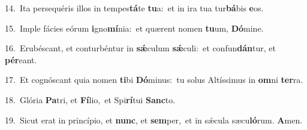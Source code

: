 {\numbfont\textcolor{\numbcolor}{14.}}~Ita persequéris illos in tempes\-\textbf{tá}\-te \textbf{tu}\-a:~\star et in ira tua tur\-\textbf{bá}\-bis \textbf{e}\-os.\par
{\numbfont\textcolor{\numbcolor}{15.}}~Imple fácies eórum \textbf{i}\-gno\-\textbf{mí}\-nia:~\star et quærent nomen \textbf{tu}\-um, \textbf{Dó}\-mine.\par
{\numbfont\textcolor{\numbcolor}{16.}}~Erubéscant, et conturbéntur in \textbf{sǽ}\-culum \textbf{sǽ}\-culi:~\star et confun\-\textbf{dán}\-tur, et \textbf{pér}\-eant.\par
{\numbfont\textcolor{\numbcolor}{17.}}~Et cognóscant quia nomen \textbf{ti}\-bi \textbf{Dó}\-minus:~\star tu solus Altíssimus in \textbf{om}\-ni \textbf{ter}\-ra.\par
{\numbfont\textcolor{\numbcolor}{18.}}~Glória \textbf{Pa}\-tri, et \textbf{Fí}\-lio,~\star et Spi\-\textbf{rí}\-tui \textbf{Sanc}\-to.\par
{\numbfont\textcolor{\numbcolor}{19.}}~Sicut erat in princípio, et \textbf{nunc}\-, et \textbf{sem}\-per,~\star et in sǽcula sæcu\-\textbf{ló}\-rum. \textbf{A}\-men.\par
